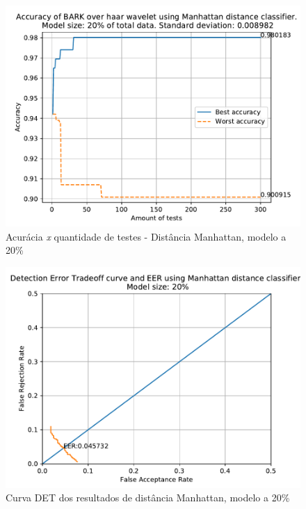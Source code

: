 			\begin{figure}[H]
				\centering
				\includegraphics[width=.9\linewidth]{images/results/confusionMatrices/classifier_Manhattan_20}
				\caption{Acurácia \textit{x} quantidade de testes - Distância Manhattan, modelo a 20\%}
				\label{fig:classifiermanhattan20}
			\end{figure}
		
			\begin{figure}[H]
				\centering
				\includegraphics[width=.9\linewidth]{images/results/det/DET_for_classifier_Manhattan_20}
				\caption{Curva DET dos resultados de distância Manhattan, modelo a 20\%}
				\label{fig:detforclassifiermanhattan20}
			\end{figure}
			
